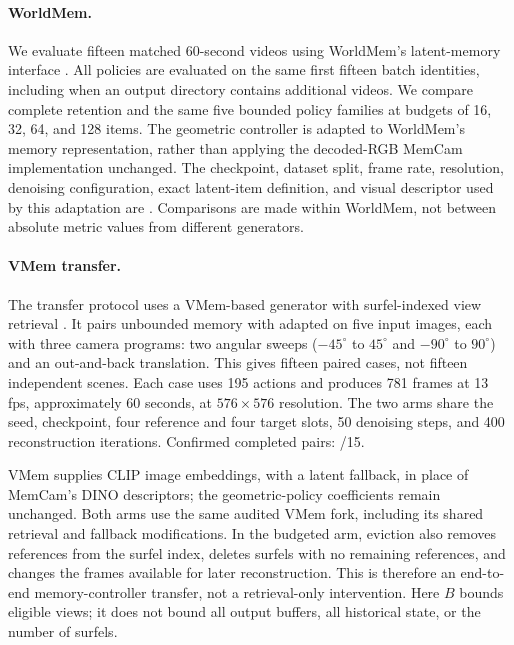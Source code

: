 \paragraph{WorldMem.}
We evaluate fifteen matched 60-second videos using WorldMem's latent-memory
interface \citep{worldmem}. All policies are evaluated on the same first
fifteen batch identities, including when an output directory contains additional
videos. We compare complete retention and the same five bounded policy families
at budgets of 16, 32, 64, and 128 items. The geometric controller is adapted to
WorldMem's memory representation, rather than applying the decoded-RGB MemCam
implementation unchanged. The checkpoint, dataset split, frame rate,
resolution, denoising configuration, exact latent-item definition, and visual
descriptor used by this adaptation are \TBD. Comparisons are made within
WorldMem, not between absolute metric values from different generators.

\paragraph{VMem transfer.}
The transfer protocol uses a VMem-based generator with surfel-indexed view
retrieval \citep{vmem}. It pairs unbounded memory with adapted  on
five input images, each with three camera programs: two angular sweeps
($-45^\circ$ to $45^\circ$ and $-90^\circ$ to $90^\circ$) and an out-and-back
translation. This gives fifteen paired cases, not fifteen independent scenes.
Each case uses 195 actions and produces 781 frames at 13 fps, approximately
60 seconds, at $576\times576$ resolution. The two arms share the seed,
checkpoint, four reference and four target slots, 50 denoising steps, and
400 reconstruction iterations. Confirmed completed pairs: \TBD/15.

VMem supplies CLIP image embeddings, with a latent fallback, in place of
MemCam's DINO descriptors; the geometric-policy coefficients remain unchanged.
Both arms use the same audited VMem fork, including its shared retrieval and
fallback modifications. In the budgeted arm, eviction also removes references
from the surfel index, deletes surfels with no remaining references, and changes
the frames available for later reconstruction. This is therefore an end-to-end
memory-controller transfer, not a retrieval-only intervention. Here $B$ bounds
eligible views; it does not bound all output buffers, all historical state,
or the number of surfels.

